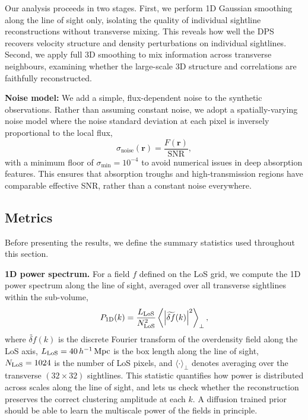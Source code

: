 Our analysis proceeds in two stages. First, we perform 1D Gaussian smoothing along the line of sight only, isolating the quality of individual sightline reconstructions without transverse mixing. This reveals how well the DPS recovers velocity structure and density perturbations on individual sightlines. Second, we apply full 3D smoothing to mix information across transverse neighbours, examining whether the large-scale 3D structure and correlations are faithfully reconstructed.

\textbf{Noise model:} We add a simple, flux-dependent noise to the synthetic observations. Rather than assuming constant noise, we adopt a spatially-varying noise model where the noise standard deviation at each pixel is inversely proportional to the local flux,
\begin{equation}
\label{eq:SNR}
\sigma_{\text{noise}}(\mathbf{r}) = \frac{F(\mathbf{r})}{\text{SNR}},
\end{equation}
with a minimum floor of $\sigma_{\min} = 10^{-4}$ to avoid numerical issues in deep absorption features. This ensures that absorption troughs and high-transmission regions have comparable effective SNR, rather than a constant noise everywhere.

\subsection{Metrics}
\label{sec:dps_metrics}
Before presenting the results, we define the summary statistics used throughout this section.

\textbf{1D power spectrum.} For a field $f$ defined on the LoS grid, we compute the 1D power spectrum along the line of sight, averaged over all transverse sightlines within the sub-volume,
\begin{equation}
P_{\rm 1D}(k) = \frac{L_{\rm LoS}}{N_{\rm LoS}^2}\left\langle \left|\widetilde{\delta f}(k)\right|^2 \right\rangle_{\perp},
\label{eq:pk1d}
\end{equation}
where $\widetilde{\delta f}(k)$ is the discrete Fourier transform of the overdensity field along the LoS axis, $L_{\rm LoS} = 40\,h^{-1}\,\mathrm{Mpc}$ is the box length along the line of sight, $N_{\rm LoS}=1024$ is the number of LoS pixels, and $\langle\cdot\rangle_\perp$ denotes averaging over the transverse $(32\times32)$ sightlines. This statistic quantifies how power is distributed across scales along the line of sight, and lets us check whether the reconstruction preserves the correct clustering amplitude at each $k$. A diffusion trained prior should be able to learn the multiscale power of the fields in principle.

